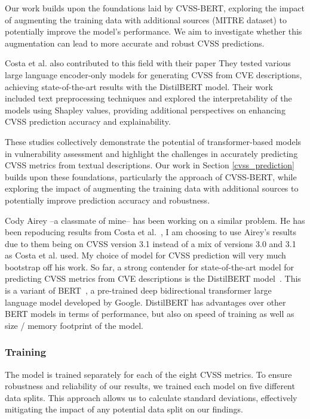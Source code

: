 \documentclass[12pt]{article}
\begin{document}
Our work builds upon the foundations laid by CVSS-BERT, exploring the impact of augmenting the
training data with additional sources (MITRE dataset) to potentially improve the model's
performance. We aim to investigate whether this augmentation can lead to more accurate and robust
CVSS predictions.

Costa et al. \cite{costa} also contributed to this field with their paper  They tested various large language encoder-only models for
generating CVSS from CVE descriptions, achieving state-of-the-art results with the DistilBERT model.
Their work included text preprocessing techniques and explored the interpretability of the models
using Shapley values, providing additional perspectives on enhancing CVSS prediction accuracy and
explainability.

These studies collectively demonstrate the potential of transformer-based models in vulnerability
assessment and highlight the challenges in accurately predicting CVSS metrics from textual
descriptions. Our work in Section \ref{cvss_prediction} builds upon these foundations, particularly
the approach of CVSS-BERT, while exploring the impact of augmenting the training data with
additional sources to potentially improve prediction accuracy and robustness.

Cody Airey --a classmate of mine-- has been working on a similar problem. He has been repoducing
results from Costa et al.\@~\cite{costa}, I am choosing to use Airey's results due to them being on
CVSS version 3.1 instead of a mix of versions 3.0 and 3.1 as Costa et al. used. My choice of model
for CVSS prediction will very much bootstrap off his work. So far, a strong contender for
state-of-the-art model for predicting CVSS metrics from CVE descriptions is the DistilBERT
model~\cite{distilbert}. This is a variant of BERT~\cite{BERT}, a pre-trained deep bidirectional
transformer large language model developed by Google. DistilBERT has advantages over other BERT
models in terms of performance, but also on speed of training as well as size / memory footprint of
the model.

\subsubsection{Training}

The model is trained separately for each of the eight CVSS metrics. To ensure robustness and
reliability of our results, we trained each model on five different data splits. This approach
allows us to calculate standard deviations, effectively mitigating the impact of any potential
 data split on our findings.
\end{document}
